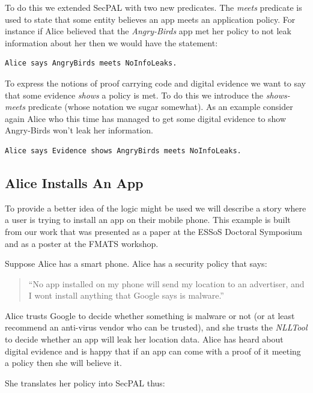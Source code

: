 \documentclass[a4paper,sfsidenotes]{tufte-book}
\begin{document}
To do this we extended SecPAL with two new predicates.  The \emph{meets}
predicate is used to state that some entity believes an app meets an application
policy.  For instance if Alice believed that the \emph{Angry-Birds} app met her
policy to not leak information about her then we would have the statement:

\begin{lstlisting}[language=SecPAL]
Alice says AngryBirds meets NoInfoLeaks.
\end{lstlisting}

To express the notions of proof carrying code\cite{Necula:1996tr} and digital
evidence we want to say that some evidence \emph{shows} a policy is met.  To do
this we introduce the \emph{shows-meets} predicate (whose notation we sugar
somewhat).  As an example consider again Alice who this time has managed to get
some digital evidence to show Angry-Birds won't leak her information.

\begin{lstlisting}[language=SecPAL]
Alice says Evidence shows AngryBirds meets NoInfoLeaks.
\end{lstlisting}

\subsection{Alice Installs An App}

To provide a better idea of the logic might be used we will describe a story
where a user is trying to install an app on their mobile phone.  This example is
built from our work that was presented as a paper at the ESSoS Doctoral
Symposium\cite{Hallett:2014un} and as a poster at the FMATS workshop.

Suppose Alice has a smart phone.  Alice has a security policy that says:

\begin{quote}
    ``No app installed on my phone will send my location to an advertiser, and I
      wont install anything that Google says is malware.''
\end{quote}

Alice trusts Google to decide whether something is malware or not (or at
least recommend an anti-virus vendor who can be trusted), and she trusts the
\emph{NLLTool} to decide whether an app will leak her location
data.  Alice has heard about digital evidence and is happy that if an app can
come with a proof of it meeting a policy then she will believe it.

She translates her policy into SecPAL thus:
\end{document}
